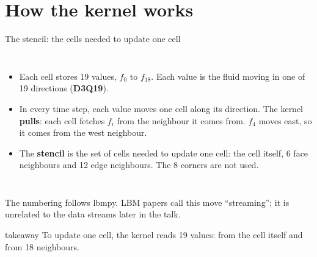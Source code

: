 \documentclass[aspectratio=169,10pt,t]{beamer}
\newcommand{\term}[1]{\textcolor{psblue!85!black}{\textbf{#1}}} %
\newcommand{\takeaway}[1]{\par\vfill
  \begin{beamercolorbox}[wd=\textwidth,sep=4pt,rounded=true]{takeaway}
    \small #1
  \end{beamercolorbox}}
\begin{document}
\section{How the kernel works}

\begin{frame}{The stencil: the cells needed to update one cell}
  \begin{columns}[T,onlytextwidth]
    \vspace{4mm}
    \centering
    \vspace{1mm}
    \begin{itemize}\small
      \item Each cell stores 19 values, $f_0$ to $f_{18}$. Each value is the fluid moving in one of
            19 directions (\term{D3Q19}).
      \item<2-> In every time step, each value moves one cell along its direction. The kernel
            \term{pulls}: each cell fetches $f_i$ from the neighbour it comes from. $f_4$ moves east, so
            it comes from the west neighbour.
      \item<4-> The \term{stencil} is the set of cells needed to update one cell: the cell itself, 6 face
            neighbours and 12 edge neighbours. The 8 corners are not used.
    \end{itemize}
  \end{columns}
  \vfill
  {\scriptsize\color{psgray}The numbering follows lbmpy. LBM papers call this move ``streaming''; it is unrelated
  to the data streams later in the talk.\par}
  \takeaway{To update one cell, the kernel reads 19 values: from the cell itself and from 18 neighbours.}
\end{frame}
\end{document}
